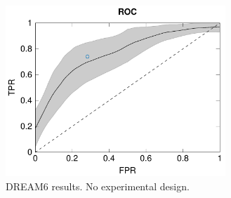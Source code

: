 \documentclass{bioinfo}
\begin{document}
\begin{methods}
%
%
%
%
%
%
%
%
%


\end{methods}

\begin{figure}[!tpb]%
\centerline{\includegraphics[width=235pt]{Figures/ROC.pdf}}
\caption{DREAM6 results. No experimental design.}\label{fig:01}
\end{figure}
\end{document}
